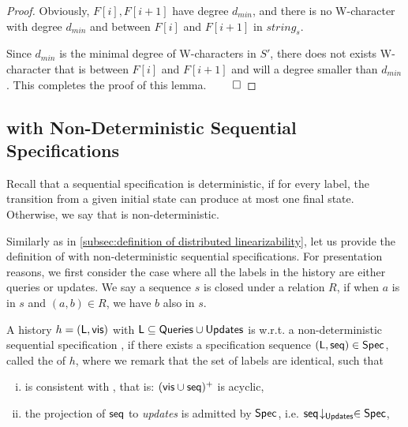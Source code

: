 {\begin {proof}
Obviously, $F[i],F[i+1]$ have degree $d_{min}$, and there is no W-character with degree $d_{min}$ and between $F[i]$ and $F[i+1]$ in $string_s$.

Since $d_{min}$ is the minimal degree of W-characters in $S'$, there does not exists W-character that is between $F[i]$ and $F[i+1]$ and will a degree smaller than $d_{min}$. This completes the proof of this lemma. $\qed$
\end {proof}






\subsection{\crdtlin{} with Non-Deterministic Sequential Specifications}
\label{subsec:appendix RA-linearizability with non-deterministic sequential specifications}

Recall that a sequential specification \Spec{} is deterministic, if for every label, the transition from a given initial state can produce at most one final state. Otherwise, we say that \Spec{} is non-deterministic.

Similarly as in \sectionautorefname \ref{subsec:definition of distributed linearizability}, let us provide the definition of \crdtlin{} with non-deterministic sequential specifications. For presentation reasons, we first consider the case where all the labels in the history are either queries or updates. We say a sequence $s$ is closed under a relation $R$, if when $a$ is in $s$ and $(a,b) \in R$, we have $b$ also in $s$.

\begin{definition}
\label{definition:ralinearizability1 with non-deterministic specifications}
A history $h = (\mathsf{L},\mathsf{vis})$ with $\mathsf{L}\subseteq \mathsf{Queries}\cup\mathsf{Updates}$ is \crdtlinearizable{} w.r.t. a non-deterministic sequential specification \Spec{}, if there exists a specification sequence $(\mathsf{L}, \mathsf{seq}) \in \mathsf{Spec}{}$, called the \emph{\crdtlinearization{}} of $h$, where we remark that the set of labels are identical, such that
\begin{enumerate}[(i)]
\item \aseqord{} is consistent with  \avisord{}, that is: $(\mathsf{vis} \cup \mathsf{seq})^{+}$ is acyclic,

\item the projection of $\mathsf{seq}$ to \emph{updates} is admitted by $\mathsf{Spec}$, i.e. $\mathsf{seq}\!\downarrow_{\mathsf{Updates}} \in \mathsf{Spec}$,


\end{enumerate}
\end{definition}}

